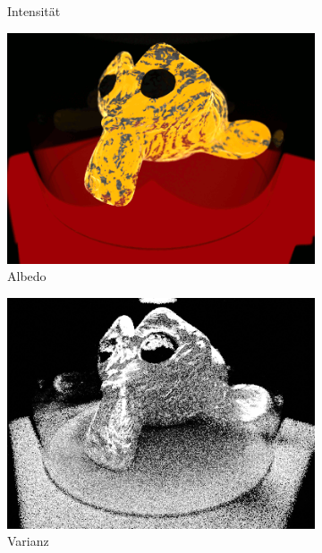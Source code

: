 \begin{figure}[!b]
\begin{subfigure}{0.33\linewidth}
				\caption{Intensität}
			\end{subfigure}
			\begin{subfigure}{0.33\linewidth}
				\includegraphics[width=\linewidth]{Medien/suzanne-albedo}
				\caption{Albedo}
			\end{subfigure}
			\begin{subfigure}{0.33\linewidth}
				\includegraphics[width=\linewidth]{Medien/suzanne-variance}
				\caption{Varianz}
			\end{subfigure}
			\begin{subfigure}{0.33\linewidth}

\end{subfigure}
\end{figure}
